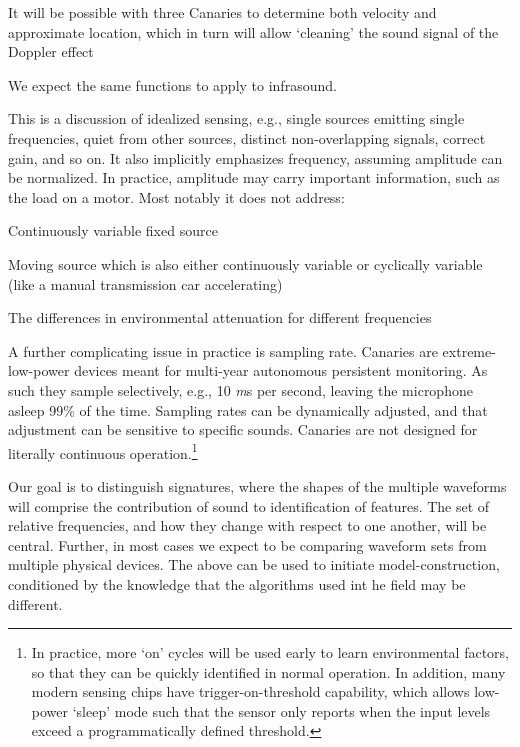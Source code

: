 \documentclass[11pt]{letter} %
\begin{document}
It will be possible with three Canaries to determine both velocity and approximate location, which in turn will allow `cleaning' the sound signal of the Doppler effect 

We expect the same functions to apply to infrasound.

This is a discussion of idealized sensing, e.g., single sources emitting single frequencies, quiet from other sources, distinct non-overlapping signals, correct gain, and so on. It also implicitly emphasizes frequency, assuming amplitude can be normalized. In practice, amplitude may carry important information, such as the load on a motor. Most notably it does not address:
\renewcommand\labelitemi{\tiny$\bullet$}
\begin{enumerate*}  
\item Continuously variable fixed source 
\item Moving source which is also either continuously variable or cyclically variable (like a manual transmission car accelerating)
\item The differences in environmental attenuation for different frequencies
\end{enumerate*}

A further complicating issue in practice is sampling rate. Canaries are extreme-low-power devices meant for multi-year autonomous persistent monitoring. As such they sample  selectively, e.g., 10 \textit{m}s per second, leaving the microphone asleep 99\% of the time. Sampling rates can be dynamically adjusted, and that adjustment can be sensitive to specific sounds. Canaries are not designed for literally continuous operation.\footnote{In practice, more `on' cycles will be used early to learn environmental factors, so that they can be quickly identified in normal operation. In addition, many modern sensing chips have trigger-on-threshold capability, which allows low-power `sleep' mode such that the sensor only reports when the input levels exceed a programmatically defined threshold.}

Our goal is to distinguish signatures, where the shapes of the multiple waveforms will comprise the contribution of sound to identification of features. The set of relative frequencies, and how they change with respect to one another, will be central. Further, in most cases we expect to be comparing waveform sets from multiple physical devices. The above can be used to initiate model-construction, conditioned by the knowledge that the algorithms used int he field may be different.
\end{document}
